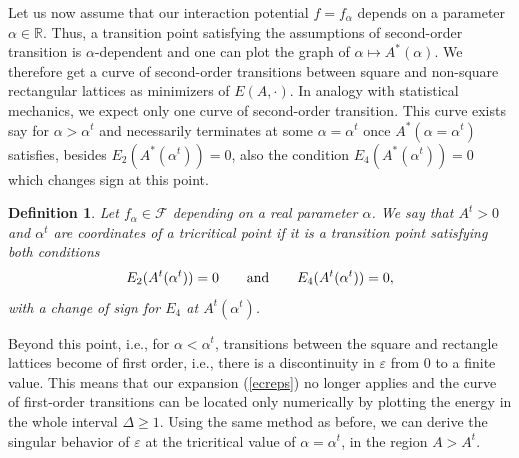\documentclass[12pt]{interact}
\newtheorem{defi}[thm]{Definition}
\theoremstyle{definition}
\newcommand{\R}{\mathbb R}
\begin{document}
Let us now assume that our interaction potential $f=f_\alpha$ depends on
a parameter $\alpha\in \R$.
Thus, a transition point satisfying the assumptions of second-order
transition is $\alpha$-dependent and one can plot the graph of
$\alpha\mapsto A^*(\alpha)$.
We therefore get a curve of second-order transitions between square and
non-square rectangular lattices as minimizers of $E(A,\cdot)$.
In analogy with statistical mechanics, we expect only
one curve of second-order transition.
This curve exists say for $\alpha>\alpha^t$ and necessarily
terminates at some $\alpha=\alpha^t$ once $A^*(\alpha=\alpha^t)$ satisfies,
besides $E_2(A^*(\alpha^t))=0$, also the condition $E_4(A^*(\alpha^t))=0$
which changes sign at this point.

\begin{defi}
Let $f_\alpha\in \mathcal{F}$ depending on a real parameter $\alpha$. We say that $A^t>0$ and $\alpha^t$ are coordinates of
a tricritical point if it is a transition point satisfying both conditions
\begin{equation} \label{tricritical}
E_2(A^t(\alpha^t)) = 0 \qquad \textnormal{and} \qquad E_4(A^t(\alpha^t)) = 0,
\end{equation}
with a change of sign for $E_4$ at $A^t(\alpha^t)$.
\end{defi}

Beyond this point, i.e., for $\alpha < \alpha^t$,
transitions between the square and rectangle lattices
become of first order, i.e., there is a discontinuity in $\varepsilon$
from 0 to a finite value.
This means that our expansion (\ref{ecreps}) no longer applies and 
the curve of first-order transitions can be located only numerically
by plotting the energy in the whole interval $\Delta\ge 1$.
Using the same method as before, we can derive the singular behavior of
$\varepsilon$ at the tricritical value of $\alpha=\alpha^t$,
in the region $A>A^t$.
\end{document}
